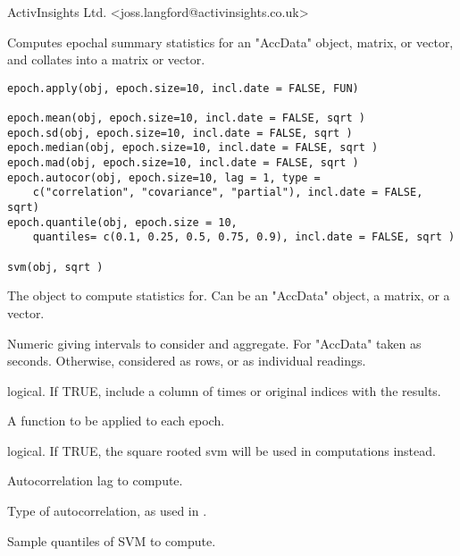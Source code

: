 \documentclass[a4paper]{book}
\begin{document}
%
\begin{Author}\relax
ActivInsights Ltd. <joss.langford@activinsights.co.uk>
\end{Author}
%
\begin{Description}\relax
Computes epochal summary statistics for an "AccData" object, matrix, or vector, and collates into a matrix or vector.
\end{Description}
%
\begin{Usage}
\begin{verbatim}
epoch.apply(obj, epoch.size=10, incl.date = FALSE, FUN)

epoch.mean(obj, epoch.size=10, incl.date = FALSE, sqrt )
epoch.sd(obj, epoch.size=10, incl.date = FALSE, sqrt )
epoch.median(obj, epoch.size=10, incl.date = FALSE, sqrt )
epoch.mad(obj, epoch.size=10, incl.date = FALSE, sqrt )
epoch.autocor(obj, epoch.size=10, lag = 1, type = 
    c("correlation", "covariance", "partial"), incl.date = FALSE, sqrt)
epoch.quantile(obj, epoch.size = 10, 
    quantiles= c(0.1, 0.25, 0.5, 0.75, 0.9), incl.date = FALSE, sqrt )

svm(obj, sqrt )
\end{verbatim}
\end{Usage}
%
\begin{Arguments}
\begin{ldescription}
\item[\code{obj}] The object to compute statistics for. Can be an "AccData" object, a matrix, or a vector.
\item[\code{epoch.size}] Numeric giving intervals to consider and aggregate. For "AccData"  taken as seconds. Otherwise, considered as rows, or as individual readings.
\item[\code{incl.date}] logical. If TRUE, include a column of times or original indices with the results.
\item[\code{FUN}] A function to be applied to each epoch.
\item[\code{sqrt}] logical. If TRUE, the square rooted svm will be used in computations instead.
\item[\code{lag}] Autocorrelation lag to compute.
\item[\code{type}] Type of autocorrelation, as used in .
\item[\code{quantiles}] Sample quantiles of SVM to compute.
\end{ldescription}
\end{Arguments}
\end{document}
